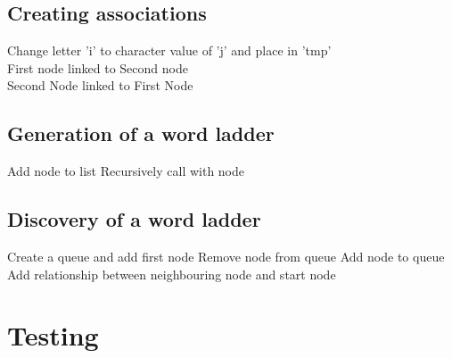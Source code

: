 \documentclass[10pt, a4paper]{article}
\begin{document}
\subsection{Creating associations}

\begin{algorithm}[H]
\SetAlgoLined
	 {
		 {
			 {
				Change letter 'i' to character value of 'j' and place in 'tmp'\\
				 {
					First node linked to Second node\\
					Second Node linked to First Node\\
				}
			}
		}
	}
\end{algorithm}

\subsection{Generation of a word ladder}

\begin{algorithm}[H]
\SetAlgoLined
	Add node to list
	 {
		 {
			Recursively call with node
		}
	}
\end{algorithm}

\subsection{Discovery of a word ladder}

\begin{algorithm}[H]
\SetAlgoLined
	Create a queue and add first node
	 {
		Remove node from queue
		 {
			Add node to queue
			Add relationship between neighbouring node and start node
		}
	}
\end{algorithm}

\section{Testing}
\end{document}
